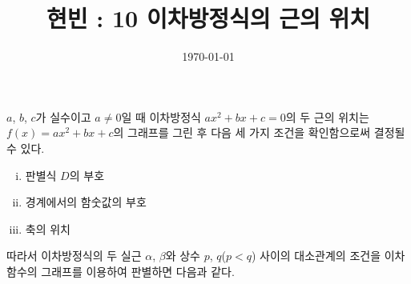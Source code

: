 \documentclass{article}
\newcounter{num}[section]
\newcommand{\defi}[1]
{\bigskip\noindent\refstepcounter{num}\textbf{정의 \arabic{num}) #1}\par}
\newcommand{\theo}[1]
{\bigskip\noindent\refstepcounter{num}\textbf{정리 \arabic{num}) #1}\par}
\begin{document}
\title{현빈 : 10 이차방정식의 근의 위치}
\author{}
\date{\today}
\maketitle

%
\(a\), \(b\), \(c\)가 실수이고 \(a\neq0\)일 때 이차방정식 \(ax^2+bx+c=0\)의 두 근의 위치는 \(f(x)=ax^2+bx+c\)의 그래프를 그린 후 다음 세 가지 조건을 확인함으로써 결정될 수 있다.
\begin{enumerate}[(i)]
\item
판별식 \(D\)의 부호
\item
경계에서의 함숫값의 부호
\item
축의 위치
\end{enumerate}
따라서 이차방정식의 두 실근 \(\alpha\), \(\beta\)와 상수 \(p\), \(q\)(\(p<q\)) 사이의 대소관계의 조건을 이차함수의 그래프를 이용하여 판별하면 다음과 같다.
\bigskip
\end{document}
